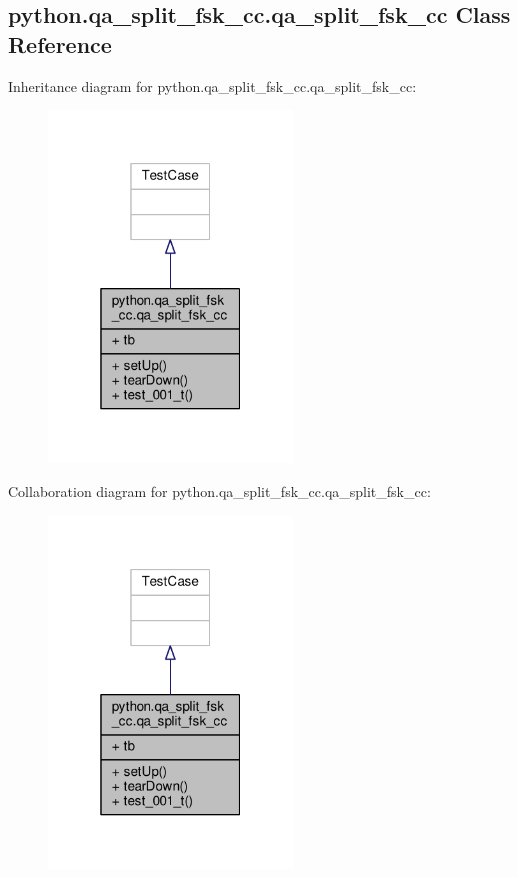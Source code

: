 \subsection{python.\+qa\+\_\+split\+\_\+fsk\+\_\+cc.\+qa\+\_\+split\+\_\+fsk\+\_\+cc Class Reference}
\label{classpython_1_1qa__split__fsk__cc_1_1qa__split__fsk__cc}


Inheritance diagram for python.\+qa\+\_\+split\+\_\+fsk\+\_\+cc.\+qa\+\_\+split\+\_\+fsk\+\_\+cc\+:
\nopagebreak
\begin{figure}[H]
\begin{center}
\leavevmode
\includegraphics[width=184pt]{d7/d2b/classpython_1_1qa__split__fsk__cc_1_1qa__split__fsk__cc__inherit__graph}
\end{center}
\end{figure}


Collaboration diagram for python.\+qa\+\_\+split\+\_\+fsk\+\_\+cc.\+qa\+\_\+split\+\_\+fsk\+\_\+cc\+:
\nopagebreak
\begin{figure}[H]
\begin{center}
\leavevmode
\includegraphics[width=184pt]{d3/ddb/classpython_1_1qa__split__fsk__cc_1_1qa__split__fsk__cc__coll__graph}
\end{center}
\end{figure}
